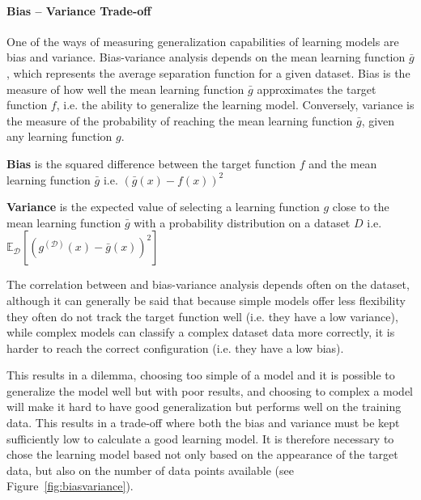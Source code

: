 \paragraph{Bias -- Variance Trade-off}
\label{par:Bias-VarianceTrade-off}
One of the ways of measuring generalization capabilities of learning models are bias and variance. Bias-variance analysis depends on the mean learning function $\bar{g}$,
which represents the average separation function for a given dataset.
Bias is the measure of how well the mean learning function $\bar{g}$ approximates the target function $f$, i.e. the ability to generalize the learning model. Conversely,
variance is the measure of the probability of reaching the mean learning function $\bar{g}$, given any learning function $g$.
\begin{dfnt}
  \textbf{Bias} is the squared difference between the target function $f$ and the mean learning function $\bar{g}$ i.e. $\left(\bar{g}(x)-f(x)\right)^2$
\end{dfnt}
\begin{dfnt}
  \textbf{Variance} is the expected value of selecting a learning function $g$ close to the mean learning function $\bar{g}$ with a probability distribution on
  a dataset $D$ i.e. $\mathbb{E}_\mathcal{D}\left[(g^{(\mathcal{D})}(x)-\bar{g}(x))^2\right]$
\end{dfnt}

The correlation between and bias-variance analysis depends often on the dataset,
although it can generally be said that because simple models offer less flexibility they often do not track the target function well (i.e. they have a low variance),
while complex models can classify a complex dataset data more correctly, it is harder to reach the correct configuration (i.e. they have a low bias).

This results in a dilemma, choosing too simple of a model and it is possible to generalize the model well but with poor results, and choosing to
complex a model will make it hard to have good generalization but performs well on the training data.
This results in a trade-off where both the bias and variance must be kept sufficiently low to calculate a good learning model.
It is therefore necessary to chose the learning model based not only based on the appearance of the target data, but also on the number of data points available (see Figure~\ref{fig:biasvariance}).

\begin{minipage}{\linewidth}
\centering
{}
\label{fig:biasvariance}
\end{minipage}
